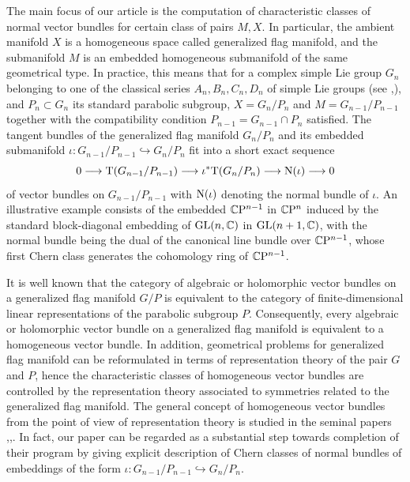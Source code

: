 The main focus of our article is the computation of characteristic
classes
of normal vector bundles for certain class of pairs $M, X$. In particular, the
ambient
manifold $X$ is a homogeneous space called generalized flag manifold, and the
submanifold $M$ is an embedded homogeneous submanifold of the same geometrical
type.
In practice, this means that for a complex simple Lie group $G_n$ belonging to
one of the classical series $A_n, B_n, C_n, D_n$ of simple Lie groups (see \cite{fulton2013representation},\cite{goodman2000representations}), and
$P_n\subset G_n$ its standard parabolic subgroup, $X=G_n/P_n$ and $M=G_{n-1}/P_{n-1}$
together with the compatibility condition $P_{n-1}=G_{n-1}\cap P_n$ satisfied.
The tangent bundles of the
generalized flag manifold $G_n/P_n$ and its embedded submanifold
$\iota : G_{n-1}/P_{n-1}\hookrightarrow G_n/P_n$
fit into a short exact sequence
$$
0 \longrightarrow \mathrm{T}(G_{n-1}/P_{n-1}) \longrightarrow \iota^*\mathrm{T}(G_n/P_n)
\longrightarrow \mathrm{N}(\iota) \longrightarrow 0
$$
of vector bundles on $G_{n-1}/P_{n-1}$ with $\mathrm{N}(\iota)$ denoting the normal bundle of $\iota$.
An illustrative example consists of the embedded $\mathbb{C}\mathrm{P}^{n-1}$ in $\mathbb{C}\mathrm{P}^{n}$ induced 
by the standard block-diagonal embedding of $\mathrm{GL}(n, \mathbb{C})$ in $\mathrm{GL}(n+1, \mathbb{C})$, with the 
normal bundle being the dual of the canonical line bundle over $\mathbb{C}\mathrm{P}^{n-1}$,
whose first Chern class generates the cohomology ring of $\mathbb{C}\mathrm{P}^{n-1}$.

It is well known that the category of algebraic or holomorphic vector
bundles on
a generalized flag manifold $G/P$ is equivalent to the category of
finite-dimensional
linear representations of the parabolic subgroup $P$. Consequently, every
algebraic or
holomorphic vector bundle on a generalized flag manifold is equivalent to
a homogeneous
vector bundle. In addition, geometrical problems for generalized flag
manifold can be
reformulated in terms of representation theory of the pair $G$ and $P$, hence
the characteristic classes of homogeneous vector bundles are controlled by
the
representation theory associated to symmetries related to the generalized
flag
manifold. The general concept of homogeneous vector bundles from the point 
of view of representation theory is studied in the seminal papers 
\cite{atiyah1961vector},\cite{borel1958characteristic},\cite{bott1957homogeneous}.
In fact, our paper can be regarded as a substantial step towards completion 
of their program by giving explicit description of Chern classes 
of normal bundles of embeddings of the form $\iota : G_{n-1}/P_{n-1}\hookrightarrow G_n/P_n$.

